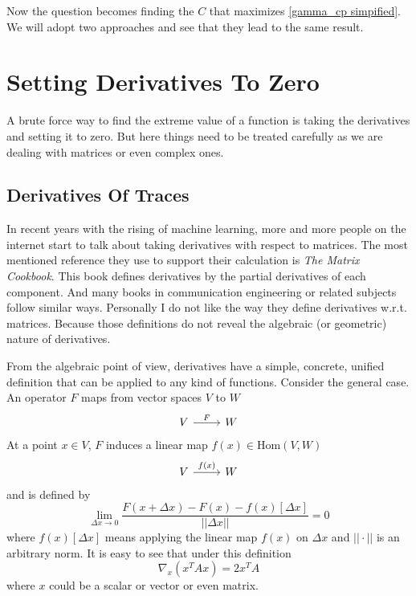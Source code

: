 \documentclass[12pt]{article}
\theoremstyle{definition}
\begin{document}
Now the question becomes finding the $C$ that maximizes \ref{gamma_cp simpified}.
We will adopt two approaches and see that they lead to the same result.

\section{Setting Derivatives To Zero}

A brute force way to find the extreme value of a function is taking the derivatives and setting it to zero. But here things need to be treated carefully as we are dealing with matrices or even complex ones.

\subsection{Derivatives Of Traces}

In recent years with the rising of machine learning, more and more people on the internet start to talk about taking derivatives with respect to matrices. The most mentioned reference they use to support their calculation is {\it The  Matrix Cookbook}. This book defines derivatives by the partial derivatives of each component. And many books in communication engineering or related subjects follow similar ways. Personally I do not like the way they define derivatives w.r.t. matrices. Because those definitions do not reveal the algebraic (or geometric) nature of derivatives. 

From the algebraic point of view, derivatives have a simple, concrete, unified definition that can be applied to any kind of functions. Consider the general case. An operator $F$ maps from vector spaces $V$ to $W$
\[\begin{tikzcd}
	V & W
	\arrow["F", from=1-1, to=1-2]
\end{tikzcd}\]
At a point $x\in V$, $F$ induces a linear map $f(x)\in\mbox{Hom}\left(V,W\right)$
\[\begin{tikzcd}
	V & W
	\arrow["f(x)", from=1-1, to=1-2]
\end{tikzcd}\]
and is defined by
\begin{equation}
	\lim_{\Delta x\rightarrow0}\frac{F(x+\Delta x)-F(x)-f(x)[\Delta x]}{||\Delta x||}=0\label{matrix deriv definition}
\end{equation}
where $f(x)[\Delta x]$ means applying the linear map $f(x)$ on $\Delta x$ and $||\cdot||$ is an arbitrary norm. It is easy to see that under this definition
\begin{equation}
	\nabla_x\left(x^TAx\right)=2x^TA\label{D xTAx}
\end{equation}
where $x$ could be a scalar or vector or even matrix.
\end{document}
